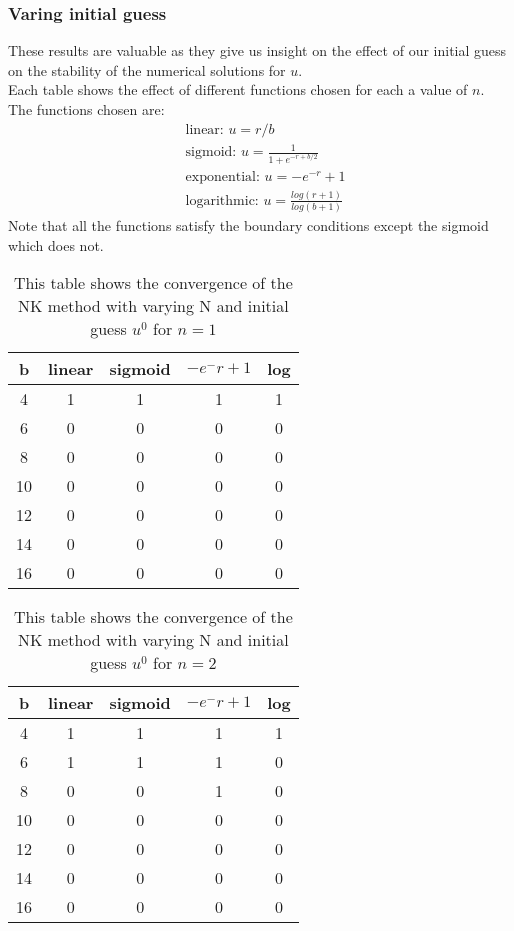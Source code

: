 \documentclass{article}
\begin{document}
\subsubsection{Varing initial guess}
These results are valuable as they give us insight on the effect of our initial guess on the stability of the numerical solutions for $u$. \\
Each table shows the effect of different functions chosen for each a value of $n$. The functions chosen are:
\begin{align*}
&\text{linear: } u = r/b  \\
&\text{sigmoid: } u = \frac{1}{1+e^{-r + b/2}} \\
&\text{exponential: } u = -e^{-r} + 1 \\
&\text{logarithmic: } u = \frac{log(r+1)}{log(b+1)} 
\end{align*}
Note that all the functions satisfy the boundary conditions except the sigmoid which does not. 
\begin{table}[H]
\centering
\begin{tabular}{|c|c|c|c|c|}
\hline
b                                          & linear  & sigmoid & $-e^-r + 1 $&log \\
\hline
4  & 1 & 1 & 1 & 1\\
6  & 0 & 0 & 0 & 0\\
8  & 0 & 0 & 0 & 0 \\
10 & 0 & 0 & 0 & 0 \\
12 & 0 & 0 & 0 & 0 \\
14 & 0 & 0 & 0 & 0 \\
16 & 0 & 0 & 0 & 0 \\
\hline
\end{tabular}
\caption{This table shows the convergence of the NK method with varying N and initial guess $u^0$ for $n=1$}
\end{table}
\begin{table}[H]
\centering
\begin{tabular}{|c|c|c|c|c|}
\hline
b                                          & linear  & sigmoid & $-e^-r + 1$ &log \\
\hline
4                                          & 1 & 1 & 1 &1\\
6                                          & 1 & 1 & 1 &0\\
8                                          & 0 & 0 & 1 &0\\
10                                         & 0 & 0 & 0 &0\\
12                                         & 0 & 0 & 0 &0\\
14                                         & 0 & 0 & 0 &0\\
16                                         & 0 & 0 & 0 &0\\
\hline
\end{tabular}
\caption{This table shows the convergence of the NK method with varying N and initial guess $u^0$ for $n=2$}
\end{table}
\end{document}
